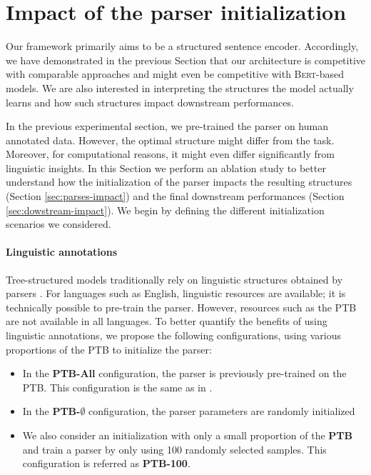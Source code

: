
\section{Impact of the parser initialization}


Our framework primarily aims to be a structured sentence encoder. Accordingly, we have demonstrated in the previous Section that our architecture is competitive with comparable approaches and might even be competitive with \textsc{Bert}-based models. We are also interested in interpreting the structures the model actually learns and how such structures impact downstream performances.

In the previous experimental section, we pre-trained the parser on human annotated data. %
However, the optimal structure might differ from the task. Moreover, for computational reasons, it might even differ significantly from linguistic insights. In this Section we perform an ablation study to better understand how the initialization of the parser impacts the resulting structures (Section \ref{sec:parses-impact}) and the final downstream performances (Section \ref{sec:dowstream-impact}). We begin by defining the different initialization scenarios we considered.

\paragraph{Linguistic annotations} Tree-structured models traditionally rely on linguistic structures obtained by parsers \parencite{tai_15}. For languages such as English, linguistic resources are available; it is technically possible to pre-train the parser. However, resources such as the PTB are not available in all languages. To better quantify the benefits of using linguistic annotations, we propose the following configurations, using various proportions of the PTB to initialize the parser:

\begin{itemize}
    \item In the \textbf{PTB-All} configuration, the parser is previously pre-trained on the PTB. This configuration is the same as in .
    \item In the \textbf{PTB-$\emptyset$} configuration, the parser parameters are randomly initialized
    \item We also consider an initialization with only a small proportion of the \textbf{PTB} and train a parser by only using 100 randomly selected samples. This configuration is referred as \textbf{PTB-100}.
\end{itemize}


